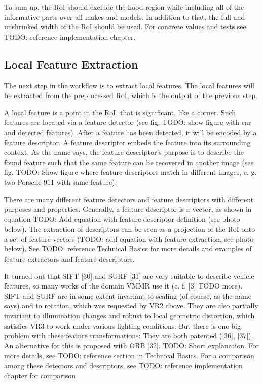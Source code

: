To sum up, the RoI should exclude the hood region while including all of the informative parts over all makes and models. In addition to that, the full and unshrinked width of the RoI should be used. For concrete values and tests see TODO: reference implementation chapter.

\subsection{Local Feature Extraction}
The next step in the workflow is to extract local features. The local features will be extracted from the preprocessed RoI, which is the output of the previous step.

A local feature is a point in the RoI, that is significant, like a corner. Such features are located via a feature detector (see fig. TODO: show figure with car and detected features). After a feature has been detected, it will be encoded by a feature descriptor. A feature descriptor embeds the feature into its surrounding context. As the name says, the feature descriptor’s purpose is to describe the found feature such that the same feature can be recovered in another image (see fig. TODO: Show figure where feature descriptors match in different images, e. g. two Porsche 911 with same feature).

There are many different feature detectors and feature descriptors with different purposes and properties. Generally, a feature descriptor is a vector, as shown in equation TODO: Add equation with feature descriptor definition (see photo below). The extraction of descriptors can be seen as a projection of the RoI onto a set of feature vectors (TODO: add equation with feature extraction, see photo below). See TODO: reference Technical Basics for more details and examples of feature extractors and feature descriptors.

It turned out that SIFT [30] and SURF [31] are very suitable to describe vehicle features, so many works of the domain VMMR use it (c. f. [3] TODO more). SIFT and SURF are in some extent invariant to scaling (of course, as the name says) and to rotation, which was requested by VR2 above. They are also partially invariant to illumination changes and robust to local geometric distortion, which satisfies VR3 to work under various lighting conditions. But there is one big problem with these feature transformations: They are both patented ([36], [37]). An alternative for this is proposed with ORB [32]. TODO: Short explanation. For more details, see TODO: reference section in Technical Basics. For a comparison among these detectors and descriptors, see TODO: reference implementation chapter for comparison

